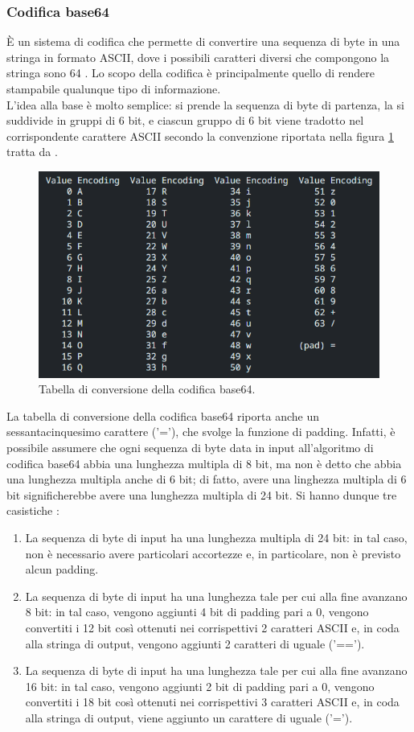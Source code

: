 \documentclass[10pt, oneside]{book}
\begin{document}
\subsubsection{Codifica base64}
È un sistema di codifica che permette di convertire una sequenza di byte in una stringa in formato ASCII, dove i possibili caratteri diversi che compongono la stringa sono 64 \cite{RFC-4648}. Lo scopo della codifica è principalmente quello di rendere stampabile qualunque tipo di informazione.\\
L'idea alla base è molto semplice: si prende la sequenza di byte di partenza, la si suddivide in gruppi di 6 bit, e ciascun gruppo di 6 bit viene tradotto nel corrispondente carattere ASCII secondo la convenzione riportata nella figura \ref{fig:base64} tratta da \cite{RFC-4648}.\\
\begin{figure}
\includegraphics[width=\linewidth]{base64.png}
\caption{Tabella di conversione della codifica base64.}
\label{fig:base64}
\end{figure}
La tabella di conversione della codifica base64 riporta anche un sessantacinquesimo carattere ('='), che svolge la funzione di padding. Infatti, è possibile assumere che ogni sequenza di byte data in input all'algoritmo di codifica base64 abbia una lunghezza multipla di 8 bit, ma non è detto che abbia una lunghezza multipla anche di 6 bit; di fatto, avere una linghezza multipla di 6 bit significherebbe avere una lunghezza multipla di 24 bit. Si hanno dunque tre casistiche \cite{RFC-4648}:
\begin{enumerate}
\item La sequenza di byte di input ha una lunghezza multipla di 24 bit: in tal caso, non è necessario avere particolari accortezze e, in particolare, non è previsto alcun padding.
\item La sequenza di byte di input ha una lunghezza tale per cui alla fine avanzano 8 bit: in tal caso, vengono aggiunti 4 bit di padding pari a 0, vengono convertiti i 12 bit così ottenuti nei corrispettivi 2 caratteri ASCII e, in coda alla stringa di output, vengono aggiunti 2 caratteri di uguale ('==').
\item La sequenza di byte di input ha una lunghezza tale per cui alla fine avanzano 16 bit: in tal caso, vengono aggiunti 2 bit di padding pari a 0, vengono convertiti i 18 bit così ottenuti nei corrispettivi 3 caratteri ASCII e, in coda alla stringa di output, viene aggiunto un carattere di uguale ('=').
\end{enumerate}
\end{document}
